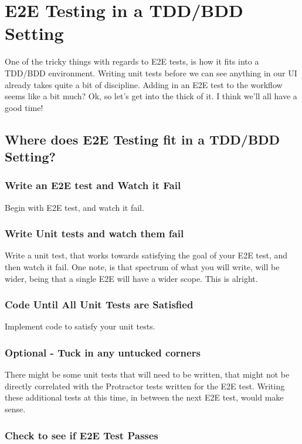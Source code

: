 \maketitle{}
\section{ E2E Testing in a TDD/BDD Setting }

One of the tricky things with regards to E2E tests, is how it fits into a
TDD/BDD environment. Writing unit tests before we can see anything in our UI
already takes quite a bit of discipline. Adding in an E2E test to the workflow
seems like a bit much? Ok, so let's get into the thick of it. I think we'll all
have a good time!

\subsection{ Where does E2E Testing fit in a TDD/BDD Setting? }

\subsubsection{ Write an E2E test and Watch it Fail }
Begin with E2E test, and watch it fail.

\subsubsection{ Write Unit tests and watch them fail }
Write a unit test, that works towards satisfying the goal of your E2E test, and
then watch it fail. One note, is that spectrum of what you will write, will
be wider, being that a single E2E will have a wider scope. This is alright.

\subsubsection{ Code Until All Unit Tests are Satisfied }
Implement code to satisfy your unit tests.

\subsubsection{ Optional - Tuck in any untucked corners }
There might be some unit tests that will need to be written, that might not be
directly correlated with the Protractor tests written for the E2E test. Writing
these additional tests at this time, in between the next E2E test, would make
sense.

\subsubsection{ Check to see if E2E Test Passes }
